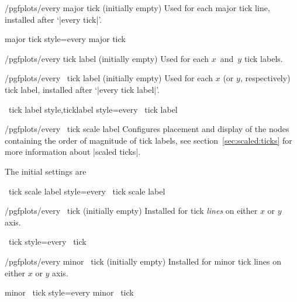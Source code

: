 \begin{stylekey}{/pgfplots/every major tick (initially empty)}
 Used for each major tick line, installed after `|every tick|'.
\end{stylekey}

\pgfplotsshortstylekey major tick style=every major tick\pgfeov

\begin{stylekey}{/pgfplots/every tick label (initially empty)}
 Used for each $x$~and~$y$ tick labels.
\end{stylekey}

\begin{xystylekey}{/pgfplots/every \x\ tick label (initially empty)}
 Used for each $x$ (or $y$, respectively) tick label, installed after `|every tick label|'.
\end{xystylekey}

\pgfplotsshortxystylekeys \x\ tick label style,\x ticklabel style=every \x\ tick label\pgfeov

\begin{xystylekey}{/pgfplots/every \x\ tick scale label}
 Configures placement and display of the nodes containing the order of magnitude of tick labels, see section~\ref{sec:scaled:ticks} for more information about |scaled ticks|.

The initial settings are
\begin{codeexample}
\end{codeexample}
\end{xystylekey}

\pgfplotsshortxystylekey \x\ tick scale label style=every \x\ tick scale label\pgfeov

\begin{xystylekey}{/pgfplots/every \x\ tick (initially empty)}
	Installed for tick \emph{lines} on either $x$ or $y$ axis.
\end{xystylekey}

\pgfplotsshortxystylekey \x\ tick style=every \x\ tick\pgfeov

\begin{xystylekey}{/pgfplots/every minor \x\ tick (initially empty)}
	Installed for minor tick lines on either $x$ or $y$ axis.
\end{xystylekey}

\pgfplotsshortxystylekey minor \x\ tick style=every minor \x\ tick\pgfeov

